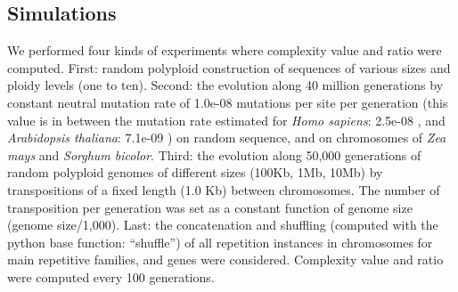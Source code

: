 \begin{table}[htbp]
{}
\caption[Genomes Complexity.]%
{{\bf Genomes Complexity.} \\Genomes size (GS), genomes complexity
  (GC), genome complexity ratio ($GCR=\frac{GC}{GS}$), and deviation
from the maximum GCR (Dmax=1-GCV) for 54 species of different
taxa. NCBI accession number or Ensembl ({\it E!}) version
(ACN-EV). {\bf \em Features}: {\bf AP}: Ancient Polyploid; {\bf DSD}: Double-Strand
DNA; {\bf EE}: Extreme Environment; {\bf GE}: Gene Expansion; {\bf IP}: Intracellular
Parasite; {\bf LBG}: Largest Bacterial Genome; {\bf LGS}: Largest Genome
Sequenced; {\bf RG}: Reduced Genome; {\bf RNA}: RNA Virus; {\bf RP}: Recent Polyploid;
{\bf SBG}: Shortest Bacterial Genome; {\bf SGS}: Shortest Genome Sequenced; {\bf SL}:
Synthetic Life; {\bf SSD}: Single-Strand DNA; {\bf UE}: Unicellular
Eukaryote. {\bf \em Notes}: -1-: 
}
\label{tab:genome}
\end{table}


\subsection{Simulations}

We performed four kinds of experiments where complexity value and ratio were computed. First: random polyploid construction of sequences of various sizes and ploidy levels (one to ten). Second: the evolution along 40 million generations by constant neutral mutation rate of 1.0e-08 mutations per site per generation (this value is in between the mutation rate estimated for {\it Homo sapiens}: 2.5e-08 \cite{Nachman2000} , and \textit{Arabidopsis thaliana}: 7.1e-09 \cite{Ossowski2010}) on random sequence, and on chromosomes of \textit{Zea mays} and \textit{Sorghum bicolor}. Third: the evolution along 50,000 generations of random polyploid genomes of different sizes (100Kb, 1Mb, 10Mb) by transpositions of a fixed length (1.0 Kb) between chromosomes. The number of transposition per generation was set as a constant function of genome size (genome size/1,000). Last: the concatenation and shuffling (computed with the python base function: “shuffle”) of all repetition instances in chromosomes for main repetitive families, and genes were considered. Complexity value and ratio were computed every 100 generations. 



